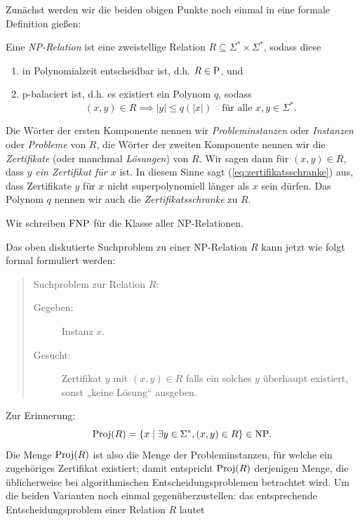 Zunächst werden wir die beiden obigen Punkte noch einmal in eine formale Definition gießen:
\begin{definition}\label{def:np-relation}
    Eine \emph{NP-Relation} ist eine zweistellige Relation $R\subseteq \Sigma^*\times\Sigma^*$, sodass diese
    \begin{enumerate}
        \item in Polynomialzeit entscheidbar ist, d.h. $R\in\P$, und
        \item p-balaciert ist, d.h. es existiert ein Polynom $q$, sodass
            \begin{equation}\label{eq:zertifikatsschranke}
                (x,y)\in R \implies |y|\leq q(|x|) \quad\text{für alle $x,y\in\Sigma^*$}.
            \end{equation}
    \end{enumerate}
    Die Wörter der ersten Komponente nennen wir \emph{Probleminstanzen} oder \emph{Instanzen} oder \emph{Probleme} von $R$, die Wörter der zweiten Komponente nennen wir die \emph{Zertifikate} (oder manchmal \emph{Lösungen}) von $R$. Wir sagen dann für $(x,y)\in R$, dass \emph{$y$ ein Zertifikat für $x$} ist. In diesem Sinne sagt (\ref{eq:zertifikatsschranke})  aus, dass Zertifikate $y$ für $x$ nicht superpolynomiell länger als $x$ sein dürfen.
    Das Polynom $q$ nennen wir auch die \emph{Zertifikatsschranke} zu $R$. 

    Wir schreiben $\FNP$ für die Klasse aller NP-Relationen. \qedhere
\end{definition}
Das oben diskutierte Suchproblem zu einer NP-Relation $R$ kann jetzt wie folgt formal formuliert werden:
\begin{quote}
    Suchproblem zur Relation $R$:
    \begin{description}
        \item[Gegeben:] Instanz $x$.
        \item[Gesucht:] Zertifikat $y$ mit $(x,y)\in  R$ falls ein solches $y$ überhaupt existiert, sonst „keine Lösung“ ausgeben.
    \end{description}
\end{quote}
Zur Erinnerung:
\[ \Proj(R) = \{ x \mid \exists y\in\Sigma^*, (x,y)\in R \}\in\NP. \]
Die Menge $\Proj(R)$ ist also die Menge der Probleminstanzen, für welche ein zugehöriges Zertifikat existiert; damit entspricht $\Proj(R)$ derjenigen Menge, die üblicherweise bei algorithmischen Entscheidungsproblemen betrachtet wird. 
Um die beiden Varianten noch einmal gegenüberzustellen: das entsprechende Entscheidungsproblem einer Relation $R$ lautet
